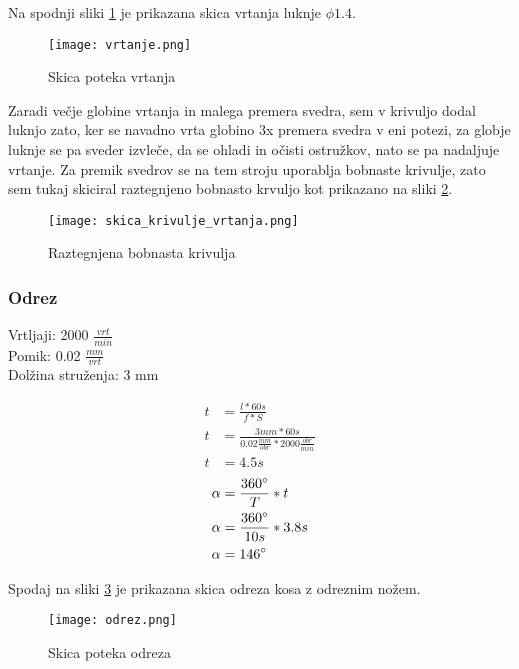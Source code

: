 Na spodnji sliki \ref{vrtanje} je prikazana skica vrtanja
luknje $\phi 1.4$.
\begin{figure}[H]
	\begin{center}
		\texttt{[image: vrtanje.png]}
		\caption{Skica poteka vrtanja
			\cite{lasten}}
		\label{vrtanje}
	\end{center}
\end{figure}

Zaradi večje globine vrtanja in malega premera svedra,
sem v krivuljo dodal luknjo zato, ker se navadno vrta globino 3x
premera svedra v eni potezi, za globje luknje se pa sveder
izvleče, da se ohladi in očisti ostružkov, nato se pa nadaljuje vrtanje.
Za premik svedrov se na tem stroju uporablja bobnaste krivulje,
zato sem tukaj skiciral raztegnjeno bobnasto krvuljo kot prikazano
na sliki \ref{raztegnjen_boben}.

\begin{figure}[H]
	\begin{center}
		\texttt{[image: skica\_krivulje\_vrtanja.png]}
		\caption{Raztegnjena bobnasta krivulja
			\cite{lasten}}
		\label{raztegnjen_boben}
	\end{center}
\end{figure}
\newpage

\subsubsection{Odrez}
Vrtljaji: 2000 \( \frac{vrt}{min} \) \\
Pomik: 0.02 \( \frac{mm}{vrt} \) \\
Dolžina struženja: 3 mm

\begin{equation}
	\begin{split}
		t &= \frac{l*60s}{f*S} \\
		t &= \frac{3mm*60s}{0.02\frac{mm}{obr}*2000\frac{obr}{min}} \\
		t &= 4.5 s
	\end{split}
\end{equation}
\begin{equation}
	\begin{split}
		\alpha &= \frac{360\degree}{T} * t \\
		\alpha &= \frac{360\degree}{10s} * 3.8 s\\
		\alpha &= 146\degree
	\end{split}
\end{equation}

Spodaj na sliki \ref{odrez} je prikazana skica odreza kosa z odreznim nožem.
\begin{figure}[H]
	\begin{center}
		\texttt{[image: odrez.png]}
		\caption{Skica poteka odreza
			\cite{lasten}}
		\label{odrez}
	\end{center}
\end{figure}

